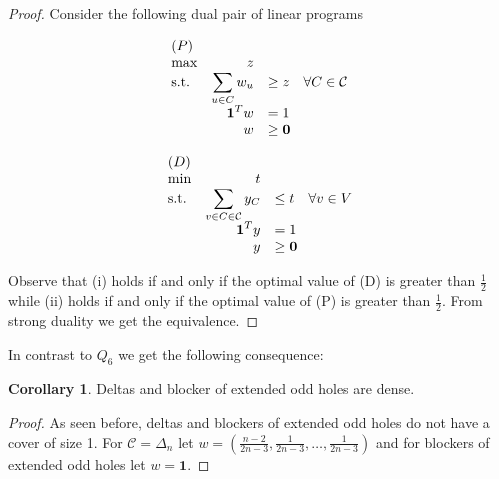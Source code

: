 \documentclass[a4paper, 12pt]{scrbook}
\theoremstyle{definition}
\newtheorem{corollary}[theorem]{Corollary}
\begin{document}
\begin{proof}
    Consider the following dual pair of linear programs
    \newline
    \newline
    \begin{minipage}{.5\linewidth}
        \begin{equation*}
            \begin{array}{l@{\quad} r l l}
                (P)\\
                \max          &z   \\
                \mathrm{s.t.}  &\displaystyle\sum\limits_{u\in C} w_u &\geq  z \quad \forall C \in \mathcal{C} \\
                    & \textbf{1}^Tw &=   1 \\
                    &   w &\geq   \textbf{0}
            \end{array}
        \end{equation*}
    \end{minipage}
    \begin{minipage}{.5\linewidth}
        \begin{equation*}
            \begin{array}{l@{\quad} r l l}
                (D)\\
                \min          &t   \\
                \mathrm{s.t.}  &\displaystyle\sum\limits_{v \in C \in \mathcal{C}} y_C &\leq  t \quad \forall v \in V \\
                    & \textbf{1}^Ty &=   1 \\
                    &   y &\geq   \textbf{0}
            \end{array}
        \end{equation*}
    \end{minipage}
    \newline
    \newline
    Observe that (i) holds if and only if the optimal value of (D) is greater than $\frac 12$ while (ii) holds if and only if the optimal value of (P) is greater than $\frac 12$.
    From strong duality we get the equivalence.
\end{proof}

In contrast to $Q_6$ we get the following consequence:
\begin{corollary}
    Deltas and blocker of extended odd holes are dense.
\end{corollary}

\begin{proof}
    As seen before, deltas and blockers of extended odd holes do not have a cover of size 1.
    For $\mathcal{C}=\Delta_n$ let $w=\left(\frac{n-2}{2n-3}, \frac 1{2n-3}, \ldots, \frac 1{2n-3}\right)$ and for blockers of extended odd holes let $w=\textbf{1}$.
\end{proof}
\end{document}
